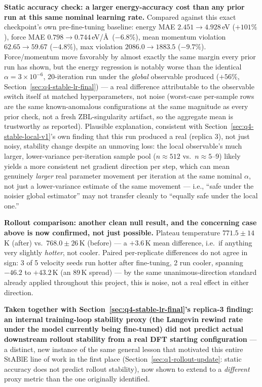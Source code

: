 \documentclass[11pt]{article}
\begin{document}
\textbf{Static accuracy check: a larger energy-accuracy cost than any
prior run at this same nominal learning rate.} Compared against this exact
checkpoint's own pre-fine-tuning baseline: energy MAE
$2.451\to4.928$\,eV ($+101\%$), force MAE $0.798\to0.744$\,eV/\AA\
($-6.8\%$), mean momentum violation $62.65\to59.67$ ($-4.8\%$), max
violation $2086.0\to1883.5$ ($-9.7\%$). Force/momentum move favorably by
almost exactly the same margin every prior run has shown, but the energy
regression is notably worse than the identical $\alpha=3\times10^{-6}$,
20-iteration run under the \emph{global} observable produced ($+56\%$,
Section~\ref{sec:q4-stable-lr-final}) --- a real difference attributable to
the observable switch itself at matched hyperparameters, not noise
(worst-case per-sample rows are the same known-anomalous configurations at
the same magnitude as every prior check, not a fresh ZBL-singularity
artifact, so the aggregate mean is trustworthy as reported). Plausible
explanation, consistent with Section~\ref{sec:q4-stable-local-v1}'s own
finding that this run produced a real (replica 3), not just noisy, stability
change despite an unmoving loss: the local observable's much larger,
lower-variance per-iteration sample pool ($n\approx512$ vs.\ $n\approx5$--9)
likely yields a more consistent net gradient direction per step, which can
mean genuinely \emph{larger} real parameter movement per iteration at the
same nominal $\alpha$, not just a lower-variance estimate of the same
movement --- i.e., ``safe under the noisier global estimator'' may not
transfer cleanly to ``equally safe under the local one.''

\textbf{Rollout comparison: another clean null result, and the concerning
case above is now confirmed, not just possible.} Plateau temperature
$771.5\pm14$\,K (after) vs.\ $768.0\pm26$\,K (before) --- a $+3.6$\,K mean
difference, i.e.\ if anything very slightly \emph{hotter}, not cooler.
Paired per-replicate differences do not agree in sign: 3 of 5 velocity
seeds run hotter after fine-tuning, 2 run cooler, spanning $-46.2$ to
$+43.2$\,K (an 89\,K spread) --- by the same unanimous-direction standard
already applied throughout this project, this is noise, not a real effect
in either direction.

\textbf{Taken together with Section~\ref{sec:q4-stable-lr-final}'s replica-3
finding: an internal training-loop stability proxy (the Langevin rewind
rate under the model currently being fine-tuned) did not predict actual
downstream rollout stability from a real DFT starting configuration} ---
a distinct, new instance of the same general lesson that motivated this
entire StABlE line of work in the first place
(Section~\ref{sec:q1-rollout-update}: static accuracy does not predict
rollout stability), now shown to extend to a \emph{different} proxy metric
than the one originally identified.
\end{document}
